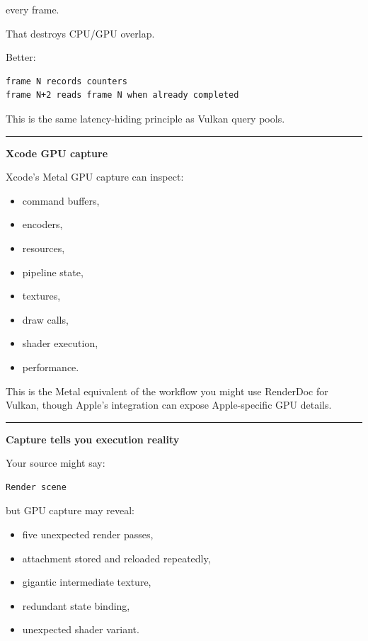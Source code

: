 every frame.

That destroys CPU/GPU overlap.

Better:

\begin{verbatim}
frame N records counters
frame N+2 reads frame N when already completed
\end{verbatim}

This is the same latency-hiding principle as Vulkan query pools.

\begin{center}\rule{0.5\linewidth}{0.5pt}\end{center}

\textbf{Xcode GPU capture}

Xcode's Metal GPU capture can inspect:

\begin{itemize}
\tightlist
\item
  command buffers,
\item
  encoders,
\item
  resources,
\item
  pipeline state,
\item
  textures,
\item
  draw calls,
\item
  shader execution,
\item
  performance.
\end{itemize}

This is the Metal equivalent of the workflow you might use RenderDoc for Vulkan, though Apple's integration can expose Apple-specific GPU details.

\begin{center}\rule{0.5\linewidth}{0.5pt}\end{center}

\textbf{Capture tells you execution reality}

Your source might say:

\begin{verbatim}
Render scene
\end{verbatim}

but GPU capture may reveal:

\begin{itemize}
\tightlist
\item
  five unexpected render passes,
\item
  attachment stored and reloaded repeatedly,
\item
  gigantic intermediate texture,
\item
  redundant state binding,
\item
  unexpected shader variant.
\end{itemize}

